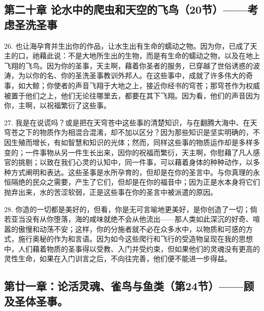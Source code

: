 \subsection{第二十章 论水中的爬虫和天空的飞鸟（20节）——考虑圣洗圣事}

26. 也让海孕育并生出你的作品，让水生出有生命的蠕动之物。因为你，已成了天主的口，祂藉此说：不是大地所生出的生物，而是有生命的蠕动之物，以及在地上飞翔的飞鸟。因为你的圣事，天主啊，藉着你圣者的服务，已穿越了世俗诱惑的波涛，为以你的名、你的圣洗圣事教训外邦人。在这些事中，成就了许多伟大的奇事，如大鲸；你使者的声音飞翔于大地之上，接近你经书的穹苍；那穹苍作为权威被置于他们之上，他们无论往哪里去，都要在其下飞翔。因为看，他们的声音因为你，主啊，以祝福繁衍了这些事。\par

27. 我是在说谎吗？或是把在天穹苍中这些事的清楚知识，与在翻腾大海中、在天穹苍之下的物质作为相混合混淆，却不加以区分？因为那些知识是坚实明确的，不因生殖而增长，有如智慧和知识的光体；然而，同样这些事的物质运作却是多样多变的；一件事物从另一件生长出来，因你的祝福而繁衍，天主啊，你慰藉了凡人感官的挑剔；以致在我们心灵的认知中，同一件事，可以藉着身体的种种动作，以多种方式阐明和表达。这些圣事是水所孕育的，但却是在你的圣言中。与你真理的永恒隔绝的民众之需要，产生了它们，但却是在你的福音中；因为正是水本身将它们抛弃出来，水的苦涩软弱，正是这些事在你的圣言中被派遣的原因。\par

28. 你造的一切都是美好的，但看，你是无可言喻地更美好，是你创造了一切；倘若亚当没有从你堕落，海的咸味就绝不会从他流出——那人类如此深沉的好奇、喧嚣的傲慢和动荡不安；这样，你的分施者就不必在众多水中，以物质和可感的方式，施行奥秘的作为和言语。因为如今这些爬行和飞行的受造物呈现在我的思想中，人们藉着物质的圣事得以受教、入门并受约束，但如果他们的灵魂没有更高的灵性生命，如果在入门训言之后，不向往完善，他们便不能进一步得益。\par


\subsection{第廿一章：论活灵魂、雀鸟与鱼类（第24节）——顾及圣体圣事。}

